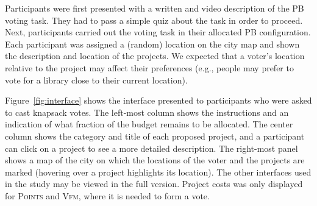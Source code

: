 \documentclass[letterpaper]{article} %
\newcommand{\points}{\textsc{Points}}
\newcommand{\vfm}{\textsc{Vfm}}
\begin{document}

 
Participants were first presented with a written and video description of the PB voting task. They had to pass a simple quiz about the task in order to proceed. 
Next, participants carried out the voting task 
in their allocated PB configuration.
Each participant was assigned a  (random) location on the city map and   shown the description and location of the projects. 
We expected that a voter's location relative to  the project may affect their   preferences (e.g., people may prefer to vote for a library  close to their current location). 
  



 




 Figure~\ref{fig:interface} shows the interface  presented to participants who were asked to cast knapsack votes. 
 The left-most column shows the instructions and an indication of what fraction of the budget remains to be allocated. The center column shows the category and title of each proposed project, and a participant can click on a project to see a more detailed description. The right-most panel shows a map of the city on which the locations of the voter and the projects are marked (hovering over a project highlights its location). The other interfaces used in the study may be viewed in the full version. Project costs was only displayed for \points{} and \vfm{}, where it is needed to form a vote. %
\end{document}
